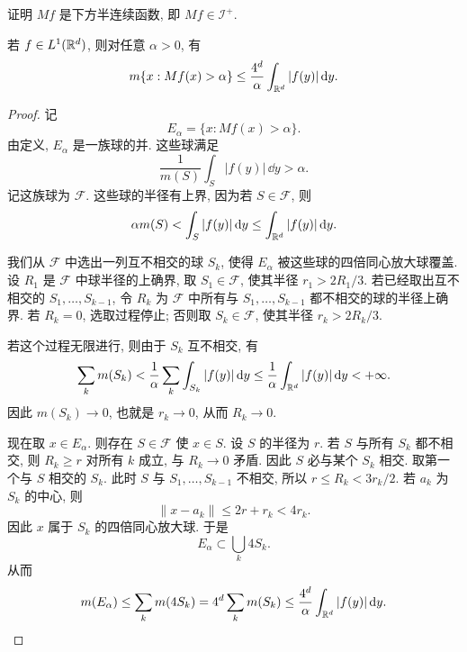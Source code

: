 \begin{exer}\label{exer:maximal-function-lsc}
	证明 \(Mf\) 是下方半连续函数, 即 \(Mf\in\mathcal I^+\).
\end{exer}

\begin{thm}
	\label{thm:hardy-maximal-weak-l1}
	若 \(f\in L^1(\mathbb{R}^d)\), 则对任意 \(\alpha>0\), 有
	\begin{equation}
		m\{x:Mf(x)>\alpha\}
		\leq
		\frac{4^d}{\alpha}\int_{\mathbb{R}^d}|f(y)|\,\dd y.
		\label{eq:hardy-maximal-weak-l1}
	\end{equation}
\end{thm}

\begin{proof}
	记
	\[
	E_\alpha=\{x:Mf(x)>\alpha\}.
	\]
	由定义, \(E_\alpha\) 是一族球的并. 这些球满足
	\[
	\frac{1}{m(S)}\int_S |f(y)|\,\dd y>\alpha.
	\]
	记这族球为 \(\mathcal F\). 这些球的半径有上界, 因为若 \(S\in\mathcal F\), 则
	\[
	\alpha m(S)<\int_S |f(y)|\,\dd y\leq \int_{\mathbb{R}^d}|f(y)|\,\dd y.
	\]
	
	我们从 \(\mathcal F\) 中选出一列互不相交的球 \(S_k\), 使得 \(E_\alpha\) 被这些球的四倍同心放大球覆盖. 设 \(R_1\) 是 \(\mathcal F\) 中球半径的上确界, 取 \(S_1\in\mathcal F\), 使其半径 \(r_1>2R_1/3\). 若已经取出互不相交的 \(S_1,\ldots,S_{k-1}\), 令 \(R_k\) 为 \(\mathcal F\) 中所有与 \(S_1,\ldots,S_{k-1}\) 都不相交的球的半径上确界. 若 \(R_k=0\), 选取过程停止; 否则取 \(S_k\in\mathcal F\), 使其半径 \(r_k>2R_k/3\).
	
	若这个过程无限进行, 则由于 \(S_k\) 互不相交, 有
	\[
	\sum_k m(S_k)
	<\frac{1}{\alpha}\sum_k\int_{S_k}|f(y)|\,\dd y
	\leq \frac{1}{\alpha}\int_{\mathbb{R}^d}|f(y)|\,\dd y<+\infty.
	\]
	因此 \(m(S_k)\to0\), 也就是 \(r_k\to0\), 从而 \(R_k\to0\).
	
	现在取 \(x\in E_\alpha\). 则存在 \(S\in\mathcal F\) 使 \(x\in S\). 设 \(S\) 的半径为 \(r\). 若 \(S\) 与所有 \(S_k\) 都不相交, 则 \(R_k\geq r\) 对所有 \(k\) 成立, 与 \(R_k\to0\) 矛盾. 因此 \(S\) 必与某个 \(S_k\) 相交. 取第一个与 \(S\) 相交的 \(S_k\). 此时 \(S\) 与 \(S_1,\ldots,S_{k-1}\) 不相交, 所以 \(r\leq R_k<3r_k/2\). 若 \(a_k\) 为 \(S_k\) 的中心, 则
	\[
	\|x-a_k\|\leq 2r+r_k<4r_k.
	\]
	因此 \(x\) 属于 \(S_k\) 的四倍同心放大球. 于是
	\[
	E_\alpha\subset \bigcup_k 4S_k.
	\]
	从而
	\[
	m(E_\alpha)
	\leq \sum_k m(4S_k)
	=4^d\sum_k m(S_k)
	\leq \frac{4^d}{\alpha}\int_{\mathbb{R}^d}|f(y)|\,\dd y.
	\]
\end{proof}

